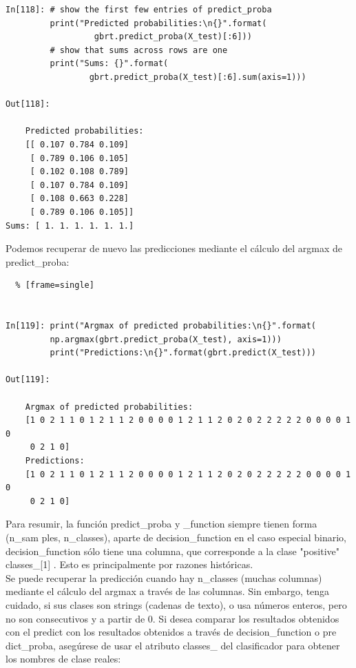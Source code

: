{\begin{lstlisting}
In[118]: # show the first few entries of predict_proba
         print("Predicted probabilities:\n{}".format(
                  gbrt.predict_proba(X_test)[:6]))
         # show that sums across rows are one
         print("Sums: {}".format(
                 gbrt.predict_proba(X_test)[:6].sum(axis=1)))

Out[118]:

    Predicted probabilities:
    [[ 0.107 0.784 0.109]
     [ 0.789 0.106 0.105]
     [ 0.102 0.108 0.789]
     [ 0.107 0.784 0.109]
     [ 0.108 0.663 0.228]
     [ 0.789 0.106 0.105]]
Sums: [ 1. 1. 1. 1. 1. 1.]

\end{lstlisting} 

Podemos recuperar de nuevo las predicciones mediante el cálculo del {\ttfamily argmax}  de {\ttfamily predict\_proba}:


\begin{lstlisting}  % [frame=single]	


In[119]: print("Argmax of predicted probabilities:\n{}".format(
         np.argmax(gbrt.predict_proba(X_test), axis=1)))
         print("Predictions:\n{}".format(gbrt.predict(X_test)))

Out[119]:
   
    Argmax of predicted probabilities:
    [1 0 2 1 1 0 1 2 1 1 2 0 0 0 0 1 2 1 1 2 0 2 0 2 2 2 2 2 0 0 0 0 1 0 
     0 2 1 0]
    Predictions:
    [1 0 2 1 1 0 1 2 1 1 2 0 0 0 0 1 2 1 1 2 0 2 0 2 2 2 2 2 0 0 0 0 1 0 
     0 2 1 0]

\end{lstlisting} 


Para resumir, la función {\ttfamily predict\_proba}  y  {\ttfamily\_function} siempre tienen forma {\ttfamily (n\_sam ples, n\_classes)}, aparte de {\ttfamily decision\_function} en el caso especial  binario, {\ttfamily decision\_function} sólo tiene una columna, que corresponde a la clase  "positive"{}    
{\ttfamily classes\_[1] }. Esto es principalmente por razones históricas.\\

 Se puede recuperar la predicción cuando hay {\ttfamily n\_classes} (muchas columnas) mediante el cálculo del {\ttfamily argmax} a través de las columnas. Sin embargo, tenga cuidado, si sus clases son strings (cadenas de texto), o usa números enteros, pero no son consecutivos y a partir de 0. Si desea comparar los resultados obtenidos con el predict con los resultados obtenidos a través de {\ttfamily decision\_function} o pre {\ttfamily dict\_proba}, asegúrese de usar el atributo {\ttfamily classes\_} del clasificador para obtener los nombres de clase reales:


}
